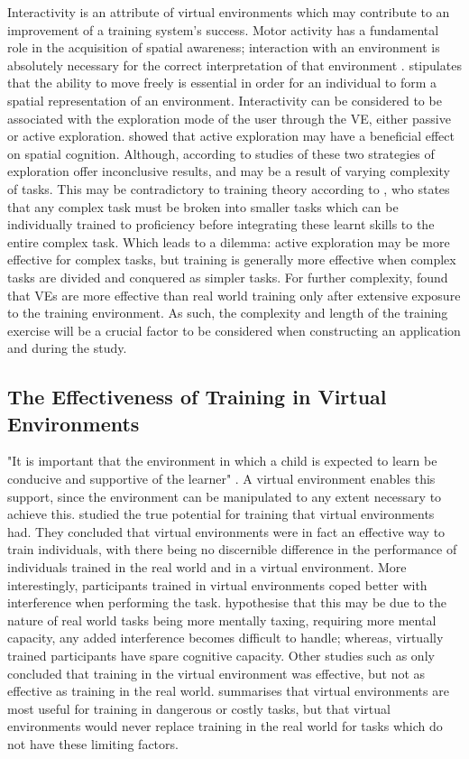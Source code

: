 \documentclass[ %
                    author={Elis Jones},
                supervisor={Dr. Kirsten Cater},
                    degree={BSc},
                     title={The Effect of Presentation Medium on Spatial Cognition},
                  subtitle={in the Virtual Environment},
                      year={2018} ]{dissertation}
\begin{document}
Interactivity is an attribute of virtual environments which may contribute to an improvement of a training system's success. Motor activity has a fundamental role in the acquisition of spatial awareness; interaction with an environment is absolutely necessary for the correct interpretation of that environment \citep{siegel}. \cite{osberg} stipulates that the ability to move freely is essential in order for an individual to form a spatial representation of an environment. Interactivity can be considered to be associated with the exploration mode of the user through the VE, either passive or active exploration. \cite{wallet} showed that active exploration may have a beneficial effect on spatial cognition. Although, according to \cite{wallet} studies of these two strategies of exploration offer inconclusive results, and may be a result of varying complexity of tasks. This may be contradictory to training theory according to \cite{goldstein}, who states that any complex task must be broken into smaller tasks which can be individually trained to proficiency before integrating these learnt skills to the entire complex task. Which leads to a dilemma: active exploration may be more effective for complex tasks, but training is generally more effective when complex tasks are divided and conquered as simpler tasks. For further complexity, \cite{waller} found that VEs are more effective than real world training only after extensive exposure to the training environment. As such, the complexity and length of the training exercise will be a crucial factor to be considered when constructing an application and during the study. 

\subsection{The Effectiveness of Training in Virtual Environments}
"It is important that the environment in which a child is expected to learn be conducive and supportive of the learner" \citep{osberg}. A virtual environment enables this support, since the environment can be manipulated to any extent necessary to achieve this. \cite{Rose2000} studied the true potential for training that virtual environments had. They concluded that virtual environments were in fact an effective way to train individuals, with there being no discernible difference in  the performance of individuals trained in the real world and in a virtual environment. More interestingly, participants trained in virtual environments coped better with interference when performing the task. \cite{Rose2000} hypothesise that this may be due to the nature of real world tasks being more mentally taxing, requiring more mental capacity, any added interference becomes difficult to handle; whereas, virtually trained participants have spare cognitive capacity. Other studies such as \cite{Hamblin2006} only concluded that training in the virtual environment was effective, but not as effective as training in the real world. \cite{Gupta2008} summarises that virtual environments are most useful for training in dangerous or costly tasks, but that virtual environments would never replace training in the real world for tasks which do not have these limiting factors. 
\end{document}
